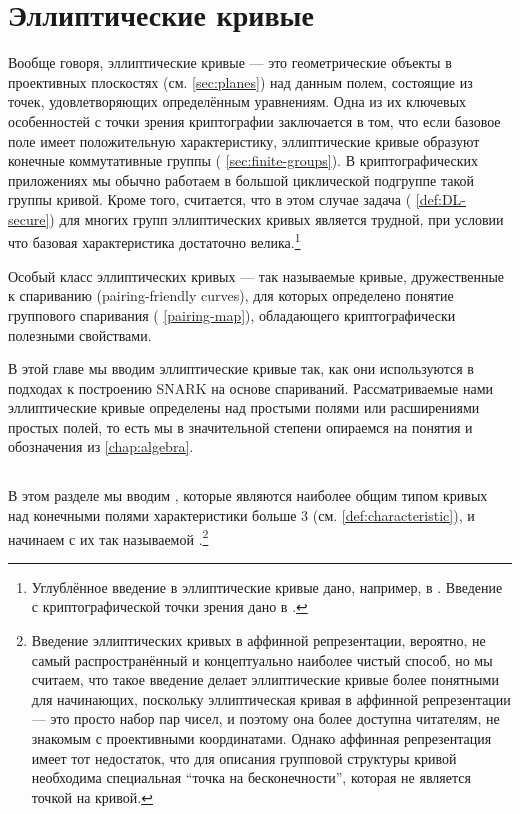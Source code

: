 \chapter{Эллиптические кривые}\label{chap:elliptic-curves}
\label{chap:elliptic_curves}
Вообще говоря, эллиптические кривые — это геометрические объекты в проективных плоскостях (см. \secname{} \ref{sec:planes}) над данным полем, состоящие из точек, удовлетворяющих определённым уравнениям. Одна из их ключевых особенностей с точки зрения криптографии заключается в том, что если базовое поле имеет положительную характеристику, эллиптические кривые образуют конечные коммутативные группы (\secname{} \ref{sec:finite-groups}). В криптографических приложениях мы обычно работаем в большой циклической подгруппе такой группы кривой. Кроме того, считается, что в этом случае задача  (\secname{} \ref{def:DL-secure}) для многих групп эллиптических кривых является трудной, при условии что базовая характеристика достаточно велика.\footnote{Углублённое введение в эллиптические кривые дано, например, в \cite{silverman-1994}. Введение с криптографической точки зрения дано в \cite{hoffstein-2008}.}

Особый класс эллиптических кривых — так называемые кривые, дружественные к спариванию (pairing-friendly curves), для которых определено понятие группового спаривания (\secname{} \ref{pairing-map}), обладающего криптографически полезными свойствами.

В этой главе мы вводим эллиптические кривые так, как они используются в подходах к построению SNARK на основе спариваний. Рассматриваемые нами эллиптические кривые определены над простыми полями или расширениями простых полей, то есть мы в значительной степени опираемся на понятия и обозначения из \chaptname{} \ref{chap:algebra}. 

\section{}
\label{sec:short_weierstrass_curve}
В этом разделе мы вводим , которые являются наиболее общим типом кривых над конечными полями характеристики больше $3$ (см. \chaptname{} \ref{def:characteristic}), и начинаем с их так называемой .\footnote{Введение эллиптических кривых в аффинной репрезентации, вероятно, не самый распространённый и концептуально наиболее чистый способ, но мы считаем, что такое введение делает эллиптические кривые более понятными для начинающих, поскольку эллиптическая кривая в аффинной репрезентации — это просто набор пар чисел, и поэтому она более доступна читателям, не знакомым с проективными координатами. Однако аффинная репрезентация имеет тот недостаток, что для описания групповой структуры кривой необходима специальная ``точка на бесконечности'', которая не является точкой на кривой.}

